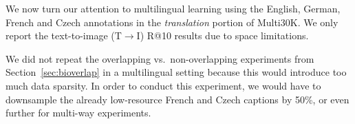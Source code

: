 We now turn our attention to multilingual learning using the English, German, French and Czech annotations in the {\it translation} portion of Multi30K. We only report the text-to-image (T$\rightarrow$I) R@10 results due to space limitations. 

We did not repeat the overlapping vs.\ non-overlapping experiments from Section~\ref{sec:bioverlap} in a multilingual setting because this would introduce too much data sparsity. In order to conduct this experiment, we would have to downsample the already low-resource French and Czech captions by 50\%, or even further for multi-way experiments.

